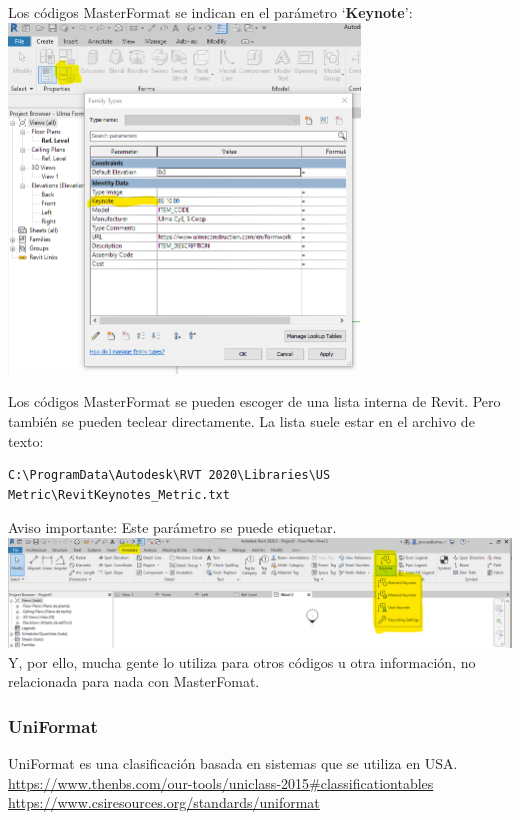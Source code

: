 \documentclass[spanish,12pt,a4paper,final,oneside]{book}
\begin{document}
Los códigos MasterFormat se indican en el parámetro `\textbf{Keynote}':
\\ \includegraphics[width=0.7\textwidth]{parametro para el codigo MasterFormat}

Los códigos MasterFormat se pueden escoger de una lista interna de Revit. Pero también se pueden teclear directamente.
La lista suele estar en el archivo de texto:
\begin{verbatim}
C:\ProgramData\Autodesk\RVT 2020\Libraries\US Metric\RevitKeynotes_Metric.txt
\end{verbatim}

Aviso importante: Este parámetro se puede etiquetar. 
\\ \includegraphics[width=\textwidth]{parametro para el codigo MasterFormat - etiquetas Keynote}
\\Y, por ello, mucha gente lo utiliza para otros códigos u otra información, no relacionada para nada con MasterFomat.

\subsubsection{UniFormat}
UniFormat es una clasificación basada en sistemas que se utiliza en USA.
\\ \url{https://www.thenbs.com/our-tools/uniclass-2015#classificationtables}
\\ \url{https://www.csiresources.org/standards/uniformat}
\end{document}

